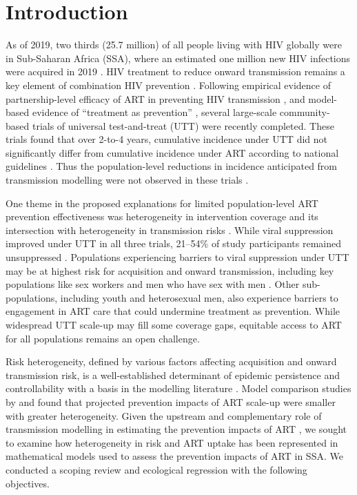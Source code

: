 \section{Introduction}
\label{s:intro}
As of 2019, two thirds (25.7 million) of all people living with HIV globally
were in Sub-Saharan Africa (SSA), where
an estimated one million new HIV infections were acquired in 2019 \cite{AIDSinfo}.
HIV treatment to reduce onward transmission remains a key element of combination HIV prevention \cite{WHO2016ART}.
Following empirical evidence of partnership-level efficacy of ART
in preventing HIV transmission \cite{Lundgren2015,Danel2015,Cohen2016},
and model-based evidence of ``treatment as prevention'' \cite{Granich2009,Eaton2012,Cori2014},
several large-scale community-based trials of universal test-and-treat (UTT) were recently completed.
These trials found that over 2-to-4 years,
cumulative incidence under UTT did not significantly differ from
cumulative incidence under ART according to national guidelines \cite{Havlir2019,Hayes2019,Iwuji2018}.
Thus the population-level reductions in incidence anticipated from transmission modelling
were not observed in these trials \cite{Baral2019,Havlir2020}.
\par
One theme in the proposed explanations for limited population-level ART prevention effectiveness
was heterogeneity in intervention coverage and its intersection with
heterogeneity in transmission risks \cite{AbdoolKarim2019,Baral2019}.
While viral suppression improved under UTT in all three trials,
21--54\% of study participants remained unsuppressed \cite{Iwuji2018,Havlir2019,Hayes2019}.
Populations experiencing barriers to viral suppression under UTT
may be at highest risk for acquisition and onward transmission, including key populations like
sex workers and men who have sex with men \cite{Hakim2018,Nyato2019}.
Other sub-populations, including youth and heterosexual men, also
experience barriers to engagement in ART care \cite{Green2020,Quinn2019}
that could undermine treatment as prevention.
While widespread UTT scale-up may fill some coverage gaps,
equitable access to ART for all populations remains an open challenge.
\par
Risk heterogeneity, defined by various factors affecting acquisition and onward transmission risk,
is a well-established determinant of epidemic persistence and controllability
with a basis in the modelling literature \cite{Anderson1986,Boily1997}.
Model comparison studies by \citet{Hontelez2013} and \citet{Rozhnova2016}
found that projected prevention impacts of ART scale-up were smaller with greater heterogeneity.
Given the upstream and complementary role of transmission modelling
in estimating the prevention impacts of ART \cite{Eaton2012,Delva2012},
we sought to examine how heterogeneity in risk and ART uptake has been represented
in mathematical models used to assess the prevention impacts of ART in SSA.
We conducted a scoping review and ecological regression with the following objectives.


